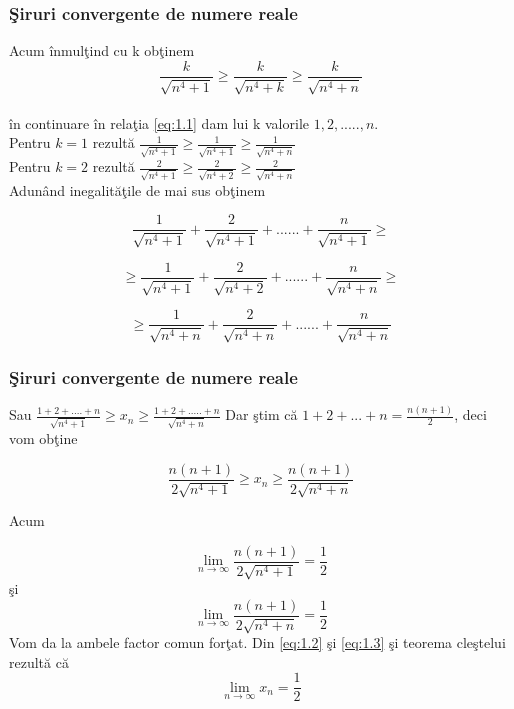 \documentclass{beamer}
\theoremstyle{plain}
\begin{document}
\frame
{
\frametitle{\c Siruri convergente de numere reale}


Acum \^ inmul\c tind cu k ob\c tinem 
\begin{displaymath}
\frac{k}{\sqrt{n^{4}+1}}\geq \frac{k}{\sqrt{n^{4}+k}}\geq \frac{k}{\sqrt{n^{4}+n}} \label{eq:1.1} \tag{1.1}
\end{displaymath}
\\ \^ in continuare \^ in rela\c tia \ref{eq:1.1} dam lui k valorile \(1,2,.....,n\). 
\\Pentru \( k = 1\) rezult\u a
\(\frac{1}{\sqrt{n^{4}+1}}\geq \frac{1}{\sqrt{n^{4}+1}}\geq \frac{1}{\sqrt{n^{4}+n}}\)
\\ Pentru \( k = 2\) rezult\u a
 \(\frac{2}{\sqrt{n^{4}+1}}\geq \frac{2}{\sqrt{n^{4}+2}}\geq \frac{2}{\sqrt{n^{4}+n}}\)
\\ Adun\^ and inegalit\u a\c tile de mai sus ob\c tinem 

\begin{displaymath}
 \frac{1}{\sqrt{n^{4}+1}}+ \frac{2}{\sqrt{n^{4}+1}}+......+ \frac{n}{\sqrt{n^{4}+1}} \geq 
\end{displaymath}
 
\begin{displaymath}
 \geq \frac{1}{\sqrt{n^{4}+1}}+ \frac{2}{\sqrt{n^{4}+2}}+......+ \frac{n}{\sqrt{n^{4}+n}}\geq
\end{displaymath}
 
\begin{displaymath}
 \geq \frac{1}{\sqrt{n^{4}+n}}+ \frac{2}{\sqrt{n^{4}+n}}+......+ \frac{n}{\sqrt{n^{4}+n}}
\end{displaymath}

}
\frame
{
\frametitle{\c Siruri convergente de numere reale}
Sau \(\frac{1+2+....+n}{\sqrt{n^{4}+1}}\geq x_{n}\geq \frac{1+2+.....+n}{\sqrt{n^{4}+n}}\)
Dar \c stim c\u a \(1+2+...+n = \frac{n(n+1)}{2}\), 
deci vom ob\c tine 

\begin{displaymath}
  \frac{n(n+1)}{2\sqrt{n^{4}+1}}\geq x_{n}\geq \frac{n(n+1)}{2\sqrt{n^{4}+n}} \label{eq:1.2} \tag{1.2}
\end{displaymath}

Acum 

\begin{displaymath}
 \lim_{n \to \infty }\frac{n(n+1)}{2\sqrt{n^{4}+1}}=\frac{1}{2} 
 \end{displaymath}
 \c si 
 \begin{displaymath}
 \lim_{n \to \infty }\frac{n(n+1)}{2\sqrt{n^{4}+n}}=\frac{1}{2} \label{eq:1.3} \tag{1.3}
\end{displaymath}
Vom da la ambele factor comun for\c tat. Din \ref{eq:1.2} \c si \ref{eq:1.3} \c si teorema cle\c stelui rezult\u a c\u a
\begin{displaymath}
 \lim_{n \to \infty }x_{n}=\frac{1}{2}
\end{displaymath}
}
\end{document}
